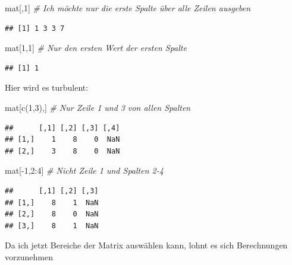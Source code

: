 \documentclass[
]{book}
\newenvironment{Shaded}{\begin{snugshade}}{\end{snugshade}}
\newcommand{\CommentTok}[1]{\textcolor[rgb]{0.56,0.35,0.01}{\textit{#1}}}
\newcommand{\DecValTok}[1]{\textcolor[rgb]{0.00,0.00,0.81}{#1}}
\newcommand{\FunctionTok}[1]{\textcolor[rgb]{0.00,0.00,0.00}{#1}}
\newcommand{\NormalTok}[1]{#1}
\newcommand{\SpecialCharTok}[1]{\textcolor[rgb]{0.00,0.00,0.00}{#1}}
\theoremstyle{definition}
\theoremstyle{definition}
\theoremstyle{definition}
\theoremstyle{definition}
\theoremstyle{remark}
\begin{document}
\begin{Shaded}
\begin{Highlighting}[]
\NormalTok{mat[,}\DecValTok{1}\NormalTok{]      }\CommentTok{\# Ich möchte nur die erste Spalte über alle Zeilen ausgeben}
\end{Highlighting}
\end{Shaded}

\begin{verbatim}
## [1] 1 3 3 7
\end{verbatim}

\begin{Shaded}
\begin{Highlighting}[]
\NormalTok{mat[}\DecValTok{1}\NormalTok{,}\DecValTok{1}\NormalTok{]     }\CommentTok{\# Nur den ersten Wert der ersten Spalte}
\end{Highlighting}
\end{Shaded}

\begin{verbatim}
## [1] 1
\end{verbatim}

Hier wird es turbulent:

\begin{Shaded}
\begin{Highlighting}[]
\NormalTok{mat[}\FunctionTok{c}\NormalTok{(}\DecValTok{1}\NormalTok{,}\DecValTok{3}\NormalTok{),] }\CommentTok{\# Nur Zeile 1 und 3 von allen Spalten}
\end{Highlighting}
\end{Shaded}

\begin{verbatim}
##      [,1] [,2] [,3] [,4]
## [1,]    1    8    0  NaN
## [2,]    3    8    0  NaN
\end{verbatim}

\begin{Shaded}
\begin{Highlighting}[]
\NormalTok{mat[}\SpecialCharTok{{-}}\DecValTok{1}\NormalTok{,}\DecValTok{2}\SpecialCharTok{:}\DecValTok{4}\NormalTok{]  }\CommentTok{\# Nicht Zeile 1 und Spalten 2{-}4}
\end{Highlighting}
\end{Shaded}

\begin{verbatim}
##      [,1] [,2] [,3]
## [1,]    8    1  NaN
## [2,]    8    0  NaN
## [3,]    8    1  NaN
\end{verbatim}

Da ich jetzt Bereiche der Matrix auswählen kann, lohnt es sich Berechnungen vorzunehmen
\end{document}
